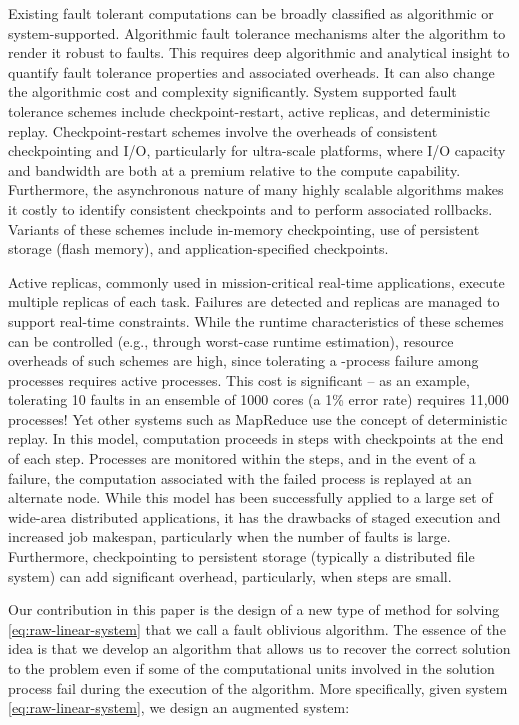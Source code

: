 \documentclass[11pt]{article}
\begin{document}
Existing fault tolerant computations can be broadly classified as algorithmic or
system-supported. Algorithmic fault tolerance mechanisms alter the algorithm to
render it robust to faults. This requires deep algorithmic and analytical insight to
quantify fault tolerance properties and associated overheads. It can also
change the algorithmic cost and complexity significantly. System supported fault tolerance 
schemes include checkpoint-restart, active replicas, and deterministic replay.
Checkpoint-restart schemes involve the overheads of consistent checkpointing and I/O,
particularly for ultra-scale platforms, where I/O capacity and bandwidth are both at
a premium relative to the compute capability. Furthermore, the asynchronous nature of many
highly scalable algorithms makes it costly to identify consistent checkpoints and to
perform associated rollbacks. Variants of these schemes include in-memory checkpointing,
use of persistent storage (flash memory), and application-specified checkpoints.

Active replicas, commonly used in mission-critical real-time applications,
execute multiple replicas of each task. Failures are detected and replicas are
managed to support real-time constraints. While the runtime characteristics of
these schemes can be controlled (e.g., through worst-case runtime estimation), resource
overheads of such schemes are high, since tolerating a -process failure
among  processes requires  active processes. This cost is significant --
as an example, tolerating 10 faults in an ensemble of 1000 cores (a 1\% error rate)
requires 11,000 processes! Yet other systems such as MapReduce use the concept of
deterministic replay. In this model, computation proceeds in steps with checkpoints
at the end of each step. Processes are monitored within the steps, and in the event
of a failure, the computation associated with the failed process is replayed at an
alternate node. While this model has been successfully applied to a large set of
wide-area distributed applications, it has the drawbacks of staged execution and
increased job makespan, particularly when the number of faults is large. Furthermore,
checkpointing to persistent storage (typically a distributed file system) can add
significant overhead, particularly, when steps are small.

Our contribution in this paper is the design of a new type of method for
solving \eqref{eq:raw-linear-system} that we call a fault oblivious algorithm.
The essence of the idea is that we develop an algorithm that allows us to recover
the correct solution to the problem even if some of the computational units involved
in the solution process fail during the execution of the algorithm.  More specifically,
given system \eqref{eq:raw-linear-system}, we design an augmented system:
\end{document}
